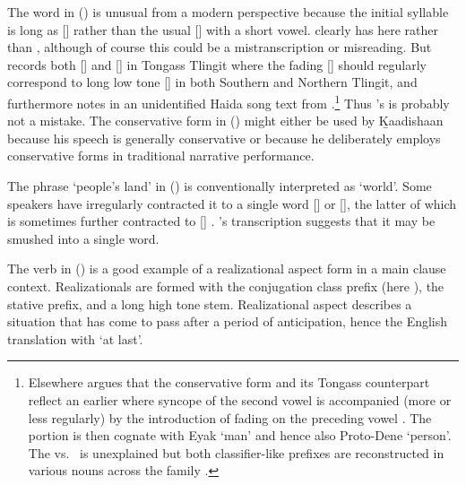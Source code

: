 The word  in (\lastx) is unusual from a modern perspective because the initial syllable is long as [] rather than the usual  [] with a short vowel.
\citeauthor{swanton:1909} clearly has  here rather than , although of course this could be a mistranscription or misreading.
But \citeauthor{leer:1973} records both  [] and  [] in Tongass Tlingit \parencite[f05/96]{leer:1973} where the fading [] should regularly correspond to long low tone [] in both Southern and Northern Tlingit, and furthermore notes  in an unidentified Haida song text from \citeauthor{swanton:1909} \parencite[f05/96]{leer:1973}.\footnote{Elsewhere \citeauthor{leer:2007} argues that the conservative form  and its Tongass counterpart  reflect an earlier  where syncope of the second vowel is accompanied (more or less regularly) by the introduction of fading on the preceding vowel \parencite[3]{leer:2007}.
The  portion is then cognate with Eyak  ‘man’ and hence also Proto-Dene  ‘person’.
The  vs.\  is unexplained but both classifier-like prefixes are reconstructed in various nouns across the family \parencite[97]{leer:1990a}.} Thus \citeauthor{swanton:1909}’s  is probably not a mistake.
The conservative form  in (\lastx) might either be used by Ḵaadishaan because his speech is generally conservative or because he deliberately employs conservative forms in traditional narrative performance.

The phrase  ‘people’s land’ in (\lastx) is conventionally interpreted as ‘world’.
Some speakers have irregularly contracted it to a single word  [] or  [], the latter of which is sometimes further contracted to  [] \parencite[\textsc{t}·50]{leer:2001}.
\citeauthor{swanton:1909}’s transcription suggests that it may be smushed into a single word.

The verb in (\lastx) is a good example of a realizational aspect form in a main clause context.
Realizationals are formed with the conjugation class prefix (here ), the stative  prefix, and a long high tone  stem.
Realizational aspect describes a situation that has come to pass after a period of anticipation, hence the English translation with ‘at last’.

